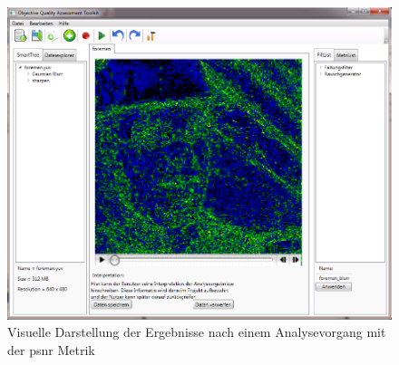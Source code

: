 \begin{figure}[p]
\includegraphics[scale=0.6]{bilder/screenResults.png}
\caption{Visuelle Darstellung der Ergebnisse nach einem Analysevorgang mit der \gls{psnr} Metrik}
\label{screenResults}
\end{figure}
